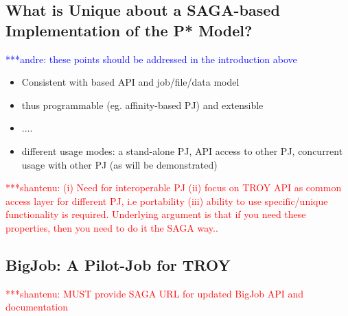 \documentclass[conference,final]{IEEEtran}
\newcommand{\jhanote}[1]{ {\textcolor{red} { ***shantenu: #1 }}}
\newcommand{\alnote}[1]{ {\textcolor{blue} { ***andre: #1 }}}
\newcommand{\alnote}[1]{}
\newcommand{\jhanote}[1]{}
\begin{document}
 



\subsection{What is Unique about a SAGA-based Implementation of the
  P* Model?}
\alnote{these points should be addressed in the introduction above}
\begin{itemize}
\item Consistent with based API and job/file/data model
\item thus programmable (eg. affinity-based PJ) and extensible 
\item ....
\item different usage modes: a stand-alone PJ, API access to other PJ,
  concurrent usage with other PJ (as will be demonstrated)
\end{itemize}


\jhanote{(i) Need for interoperable PJ (ii) focus on TROY API as
  common access layer for different PJ, i.e portability (iii) ability
  to use specific/unique functionality is required. Underlying
  argument is that if you need these properties, then you need to do
  it the SAGA way..}

\subsection{BigJob: A Pilot-Job for TROY}

\jhanote{MUST provide SAGA URL for updated BigJob API and
  documentation}


\end{document}
